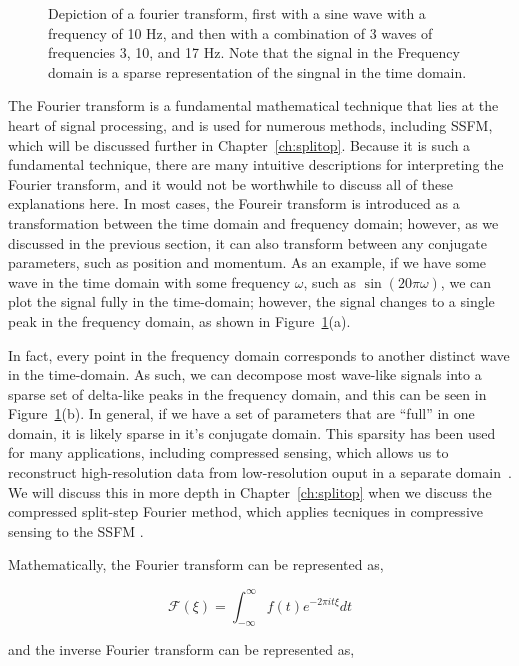 \begin{figure}
\begin{centering}
\end{centering}

\caption{Depiction of a fourier transform, first with a sine wave with a frequency of 10 Hz, and then with a combination of 3 waves of frequencies 3, 10, and 17 Hz. Note that the signal in the Frequency domain is a sparse representation of the singnal in the time domain.}
\label{fig:FT}
\end{figure}

The Fourier transform is a fundamental mathematical technique that lies at the heart of signal processing, and is used for numerous methods, including SSFM, which will be discussed further in Chapter~\ref{ch:splitop}.
Because it is such a fundamental technique, there are many intuitive descriptions for interpreting the Fourier transform, and it would not be worthwhile to discuss all of these explanations here.
In most cases, the Foureir transform is introduced as a transformation between the time domain and frequency domain; however, as we discussed in the previous section, it can also transform between any conjugate parameters, such as position and momentum.
As an example, if we have some wave in the time domain with some frequency $\omega$, such as $\sin(20\pi\omega)$, we can plot the signal fully in the time-domain; however, the signal changes to a single peak in the frequency domain, as shown in Figure~\ref{fig:FT}(a).

In fact, every point in the frequency domain corresponds to another distinct wave in the time-domain.
As such, we can decompose most wave-like signals into a sparse set of delta-like peaks in the frequency domain, and this can be seen in Figure~\ref{fig:FT}(b).
In general, if we have a set of parameters that are ``full'' in one domain, it is likely sparse in it's conjugate domain.
This sparsity has been used for many applications, including compressed sensing, which allows us to reconstruct high-resolution data from low-resolution ouput in a separate domain~\cite{baraniuk2011}.
We will discuss this in more depth in Chapter~\ref{ch:splitop} when we discuss the compressed split-step Fourier method, which applies tecniques in compressive sensing to the SSFM \cite{bayindir2015}.

Mathematically, the Fourier transform can be represented as,

$$
\mathcal{F}(\xi) = \int_{-\infty}^{\infty}f(t)e^{-2\pi i t \xi}dt
$$

\noindent and the inverse Fourier transform can be represented as,

